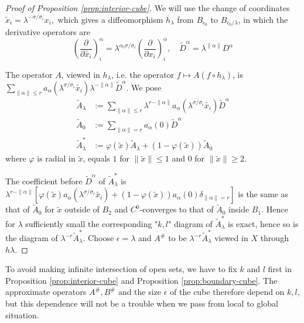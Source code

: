 \begin{proof}[Proof of Proposition \ref{prop:interior-cube}]
We will use the change of coordinates
\(\tilde x_i = \lambda^{-\sigma/\sigma_i}x_i,\)
which gives a diffeomorphism \(h_\lambda\) from \(B_{\epsilon_0}\) to \(B_{\epsilon_0/\lambda}\), in which the derivative operators are 
\[ 
\left(\frac{\partial}{\partial \tilde{x_i}}\right)^\alpha_i =
\lambda^{\alpha_i\sigma/\sigma_i}\left(\frac{\partial}{\partial x_i}\right)^\alpha_i,\quad
\tilde D^\alpha  = \lambda^{\|\alpha\|}D^\alpha 
\]

The operator \(A\), viewed in \(h_\lambda\), i.e. the operator \(f\mapsto
A(f\circ h_\lambda)\), is \(\sum_{\|\alpha\|\leq r}
a_\alpha(\lambda^{\sigma/\sigma_i}\tilde{x_i}) \lambda^{-\|\alpha\|} \tilde D^\alpha\). We pose
\begin{align*}
  \tilde A_\lambda &:= \sum_{\|\alpha\|\leq r}\lambda^{r-\|\alpha\|} a_{\alpha}(\lambda^{\sigma/\sigma_i}\tilde{x_i}) \tilde D^\alpha \\  
  \tilde A_0 &:= \sum_{\|\alpha\|= r} a_{\alpha}(0) \tilde D^\alpha\\
  \tilde A_\lambda^* &:= \varphi(\tilde x) \tilde A_\lambda + (1-\varphi(\tilde x)) \tilde A_0
\end{align*}
where \(\varphi\) is radial in \(\tilde x\), equals \(1\) for \(\|\tilde x\|\leq 1\) and \(0\) for \(\|\tilde x\| \geq 2\).

The coefficient before \(\tilde D^\alpha\) of \(\tilde A_\lambda^*\) is \(\lambda^{r-\|\alpha\|} \left[\varphi(\tilde x) a_\alpha(\lambda^{\sigma/\sigma_i} \tilde{x_i}) +
(1-\varphi(\tilde x))a_\alpha(0)\delta_{\|\alpha\|=r}\right]\) is the same as that of \(\tilde A_0\) for \(\tilde x\) outside of \(B_2\) and \(C^0\)-converges to that of \(\tilde
A_0\) inside \(B_1\). Hence for \(\lambda\) sufficiently small the corresponding "\(k,l\)" diagram of \(\tilde A^*_\lambda\) is exact, hence so is the diagram of \(\lambda^{-r}\tilde
A_\lambda^*\). Choose \(\epsilon = \lambda\) and \(A^\#\) to be \(\lambda^{-r}\tilde
A_\lambda^*\) viewed in \(X\) through \(h\lambda\).
\end{proof}

\begin{remark}
To avoid making infinite intersection of open sets, we have to fix \(k\) and \(l\) first in Proposition \ref{prop:interior-cube}
and Proposition \ref{prop:boundary-cube}. The approximate operators \(A^\#, B^\#\) and the
size \(\epsilon\) of the cube therefore depend on \(k,l\), but this dependence will
not be a trouble when we pass from local to global situation.
\end{remark}


